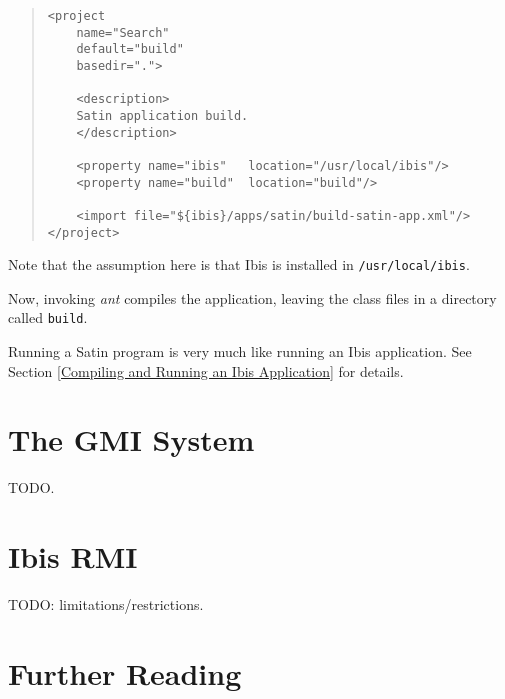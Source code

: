 \documentclass[10pt]{article}
\newcommand{\mysection}[1]{\section{#1}\label{#1}}
\begin{document}
\begin{quote}
\begin{verbatim}
<project
    name="Search"
    default="build"
    basedir=".">

    <description>
    Satin application build.
    </description>

    <property name="ibis"   location="/usr/local/ibis"/>
    <property name="build"  location="build"/>

    <import file="${ibis}/apps/satin/build-satin-app.xml"/>
</project>
\end{verbatim}
\end{quote}
Note that the assumption here is that Ibis is installed in
\verb+/usr/local/ibis+.

Now, invoking \emph{ant} compiles the application, leaving the class files
in a directory called \verb+build+.

Running a Satin program is very much like running an Ibis application.
See Section \ref{Compiling and Running an Ibis Application} for details.

\mysection{The GMI System}

TODO.

\mysection{Ibis RMI}

TODO: limitations/restrictions.

\mysection{Further Reading}
\end{document}
